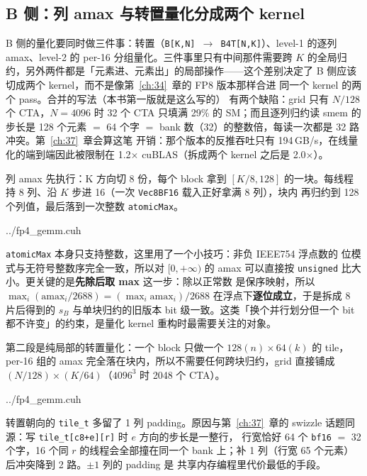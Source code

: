 \subsection{B 侧：列 amax 与转置量化分成两个 kernel}

B 侧的量化要同时做三件事：转置（\texttt{B[K,N] $\to$ B4T[N,K]}）、level-1
的逐列 amax、level-2 的 per-16 分组量化。三件事里只有中间那件需要跨 $K$
的全局归约，另外两件都是「元素进、元素出」的局部操作——这个差别决定了
B 侧应该切成两个 kernel，而不是像第~\ref{ch:34}~章的 FP8 版本那样合进
同一个 kernel 的两个 pass。合并的写法（本书第一版就是这么写的）
有两个缺陷：grid 只有 $N/128$ 个 CTA，$N{=}4096$ 时 32 个 CTA 只填满
29\% 的 SM；而且逐列归约读 smem 的步长是 128 个元素 $=$ 64 个字 $=$
bank 数（32）的整数倍，每读一次都是 32 路冲突。第~\ref{ch:37}~章会算这笔
开销：那个版本的反推吞吐只有 194\,GB/s，在线量化的端到端因此被限制在
1.2$\times$ cuBLAS（拆成两个 kernel 之后是 2.0$\times$）。

列 amax 先执行：K 方向切 8 份，每个 block 拿到 $[K/8, 128]$ 的一块。每线程
持 8 列、沿 $K$ 步进 16（一次 \texttt{Vec8BF16} 载入正好拿满 8 列），块内
再归约到 128 个列值，最后落到一次整数 \texttt{atomicMax}。

\begin{lstinputlisting}[linerange={243-285},firstnumber=auto,
  title={fp4\_gemm.cuh L243-285（列 amax：分片 + 整数 atomicMax）}]{../fp4_gemm.cuh}
\end{lstinputlisting}

\texttt{atomicMax} 本身只支持整数，这里用了一个小技巧：非负 IEEE754 浮点数的
位模式与无符号整数序完全一致，所以对 $[0, +\infty)$ 的 amax 可以直接按
\texttt{unsigned} 比大小。更关键的是\textbf{先除后取 max} 这一步：除以正常数
是保序映射，所以 $\max_i(\mathrm{amax}_i/2688) = (\max_i \mathrm{amax}_i)/2688$
在浮点下\textbf{逐位成立}，于是拆成 8 片后得到的 $s_B$ 与单块归约的旧版本
bit 级一致。这类「换个并行划分但一个 bit 都不许变」的约束，是量化 kernel
重构时最需要关注的对象。

第二段是纯局部的转置量化：一个 block 只做一个 $128(n)\times64(k)$ 的 tile，
per-16 组的 amax 完全落在块内，所以不需要任何跨块归约，grid 直接铺成
$(N/128)\times(K/64)$（$4096^3$ 时 2048 个 CTA）。

\begin{lstinputlisting}[linerange={287-365},firstnumber=auto,
  title={fp4\_gemm.cuh L287-365（转置量化：grid 映射与双朝向 staging）}]{../fp4_gemm.cuh}
\end{lstinputlisting}

转置朝向的 \texttt{tile\_t} 多留了 1 列 padding。原因与第~\ref{ch:37}~章的
swizzle 话题同源：写 \texttt{tile\_t[c8+e][r]} 时 $e$ 方向的步长是一整行，
行宽恰好 64 个 \texttt{bf16} $=$ 32 个字，16 个同 $r$ 的线程会全部撞在同一个
bank 上；补 1 列（行宽 65 个元素）后冲突降到 2 路。$\pm1$ 列的 padding 是
共享内存编程里代价最低的手段。

